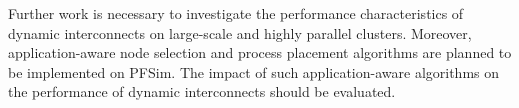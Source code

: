 Further work is necessary to investigate the performance characteristics of
dynamic interconnects on large-scale and highly parallel clusters. Moreover,
application-aware node selection and process placement algorithms are planned
to be implemented on PFSim. The impact of such application-aware algorithms on
the performance of dynamic interconnects should be evaluated.
